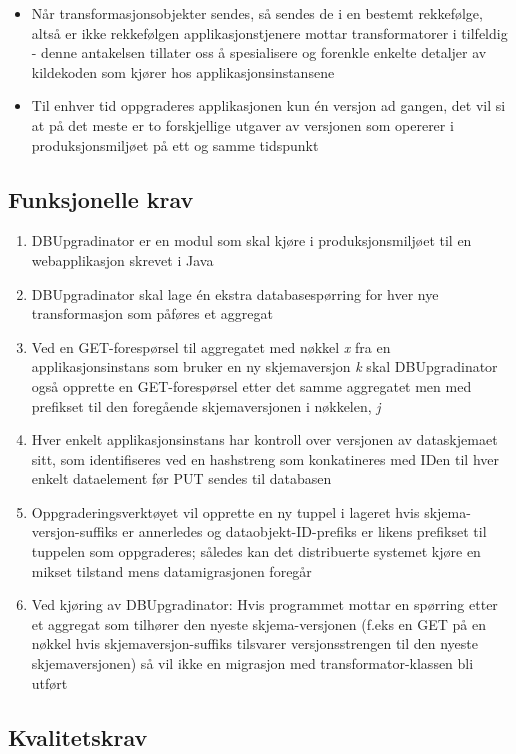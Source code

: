 \begin{itemize}
  \item Når transformasjonsobjekter sendes, så sendes de i en bestemt rekkefølge, altså er ikke rekkefølgen applikasjonstjenere mottar transformatorer i tilfeldig - denne antakelsen tillater oss å spesialisere og forenkle enkelte detaljer av kildekoden som kjører hos applikasjonsinstansene
  \item Til enhver tid oppgraderes applikasjonen kun én versjon ad gangen, det vil si at på det meste er to forskjellige utgaver av versjonen som opererer i produksjonsmiljøet på ett og samme tidspunkt
\end{itemize}

\subsection{Funksjonelle krav}

\begin{enumerate}
  \item DBUpgradinator er en modul som skal kjøre i produksjonsmiljøet til en webapplikasjon skrevet i Java
  \item DBUpgradinator skal lage én ekstra databasespørring for hver nye transformasjon som påføres et aggregat
  \item Ved en GET-forespørsel til aggregatet med nøkkel \emph{x} fra en applikasjonsinstans som bruker en ny skjemaversjon \emph{k} skal DBUpgradinator også opprette en GET-forespørsel etter det samme aggregatet men med prefikset til den foregående skjemaversjonen i nøkkelen, \emph{j}
  \item Hver enkelt applikasjonsinstans har kontroll over versjonen av dataskjemaet sitt, som identifiseres ved en hashstreng som konkatineres med IDen til hver enkelt dataelement før PUT sendes til databasen
  \item Oppgraderingsverktøyet vil opprette en ny tuppel i lageret hvis skjema-versjon-suffiks er annerledes og dataobjekt-ID-prefiks er likens prefikset til tuppelen som oppgraderes; således kan det distribuerte systemet kjøre en mikset tilstand mens datamigrasjonen foregår
  \item Ved kjøring av DBUpgradinator: Hvis programmet mottar en spørring etter et aggregat som tilhører den nyeste skjema-versjonen (f.eks en GET på en nøkkel hvis skjemaversjon-suffiks tilsvarer versjonsstrengen til den nyeste skjemaversjonen) så vil ikke en migrasjon med transformator-klassen bli utført
\end{enumerate}

\subsection{Kvalitetskrav}


